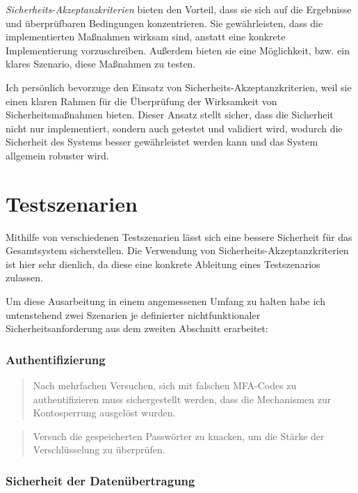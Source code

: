 \documentclass{article}
\begin{document}
\textit{Sicherheits-Akzeptanzkriterien} bieten den Vorteil, dass sie sich auf die 
Ergebnisse und überprüfbaren Bedingungen konzentrieren. Sie gewährleisten, dass die 
implementierten Maßnahmen wirksam sind, anstatt eine konkrete Implementierung 
vorzuschreiben. Außerdem bieten sie eine Möglichkeit, bzw. ein klares Szenario, diese 
Maßnahmen zu testen.

\vspace{1em}

Ich persönlich bevorzuge den Einsatz von Sicherheits-Akzeptanzkriterien, weil sie einen 
klaren Rahmen für die Überprüfung der Wirksamkeit von Sicherheitsmaßnahmen bieten. Dieser 
Ansatz stellt sicher, dass die Sicherheit nicht nur implementiert, sondern auch getestet 
und validiert wird, wodurch die Sicherheit des Systems besser gewährleistet werden kann 
und das System allgemein robuster wird.

\section{Testszenarien}

Mithilfe von verschiedenen Testszenarien lässt sich eine bessere Sicherheit für das 
Gesamtsystem sicherstellen. Die Verwendung von Sicherheits-Akzeptanzkriterien ist hier 
sehr dienlich, da diese eine konkrete Ableitung eines Testszenarios zulassen.

Um diese Ausarbeitung in einem angemessenen Umfang zu halten habe ich untenstehend zwei 
Szenarien je definierter nichtfunktionaler Sicherheitsanforderung aus dem zweiten 
Abschnitt erarbeitet:

\subsubsection*{Authentifizierung}

\begin{quote}
Nach mehrfachen Versuchen, sich mit falschen MFA-Codes zu authentifizieren muss 
sichergestellt werden, dass die Mechanismen zur Kontosperrung ausgelöst wurden.
\end{quote}

\begin{quote}
Versuch die gespeicherten Passwörter zu knacken, um die Stärke der Verschlüsselung zu 
überprüfen.
\end{quote}

\subsubsection*{Sicherheit der Datenübertragung}
\end{document}
